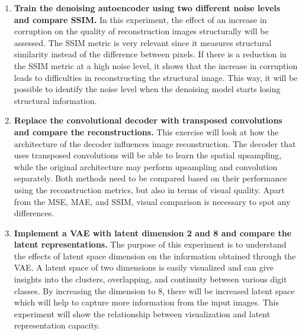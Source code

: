 \documentclass[10pt]{article}
\begin{document}
\begin{enumerate}
\item \textbf{Train the denoising autoencoder using two different noise levels and compare SSIM.}
In this experiment, the effect of an increase in corruption on the quality of reconstruction images structurally will be assessed. The SSIM metric is very relevant since it measures structural similarity instead of the difference between pixels. If there is a reduction in the SSIM metric at a high noise level, it shows that the increase in corruption leads to difficulties in reconstructing the structural image. This way, it will be possible to identify the noise level when the denoising model starts losing structural information.
\item \textbf{Replace the convolutional decoder with transposed convolutions and compare the reconstructions.}
This exercise will look at how the architecture of the decoder influences image reconstruction. The decoder that uses transposed convolutions will be able to learn the spatial upsampling, while the original architecture may perform upsampling and convolution separately. Both methods need to be compared based on their performance using the reconstruction metrics, but also in terms of visual quality. Apart from the MSE, MAE, and SSIM, visual comparison is necessary to spot any differences.

\item \textbf{Implement a VAE with latent dimension 2 and 8 and compare the latent representations.}
The purpose of this experiment is to understand the effects of latent space dimension on the information obtained through the VAE. A latent space of two dimensions is easily visualized and can give insights into the clusters, overlapping, and continuity between various digit classes. By increasing the dimension to 8, there will be increased latent space which will help to capture more information from the input images. This experiment will show the relationship between visualization and latent representation capacity.


\end{enumerate}
\end{document}

